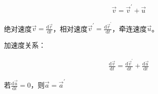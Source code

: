 \documentclass[
	12pt, %
	fleqn, %
	a4paper, %
]{myLegrandOrangeBook}
\newcommand{\rmd}{\mathrm{d}}
\newcommand{\deriv}[2]{\frac{\rmd #1}{\rmd #2}}
\begin{document}
    \begin{align}
        \overrightarrow{v} = \overrightarrow{v}^{'} + \overrightarrow{u}
    \end{align}

    绝对速度\(\overrightarrow{v} = \deriv{\overrightarrow{r}}{t}\)，相对速度\(\overrightarrow{v}^{'} =
    \deriv{\overrightarrow{r}^{'}}{t}\)，牵连速度\(\overrightarrow{u}\)。

    加速度关系：

    \begin{align}
        \deriv{\overrightarrow{v}}{t} = \deriv{\overrightarrow{v}^{'}}{t} + \deriv{\overrightarrow{u}}{t}
    \end{align}

    若\(\deriv{\overrightarrow{u}}{t} = 0\)，则\(\overrightarrow{a} = \overrightarrow{a}^{'}\)



\end{document}
